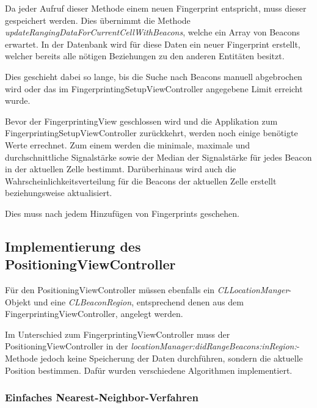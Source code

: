 Da jeder Aufruf dieser Methode einem neuen Fingerprint entspricht, muss dieser gespeichert werden. 
Dies übernimmt die Methode \emph{updateRangingDataForCurrentCellWithBeacons}, welche ein Array von Beacons erwartet. In der Datenbank wird für diese Daten ein neuer Fingerprint erstellt, welcher bereits alle nötigen Beziehungen zu den anderen Entitäten besitzt. 

Dies geschieht dabei so lange, bis die Suche nach Beacons manuell abgebrochen wird oder das im FingerprintingSetupViewController angegebene Limit erreicht wurde. 

Bevor der FingerprintingView geschlossen wird und die Applikation zum FingerprintingSetupViewController zurückkehrt, werden noch einige benötigte Werte errechnet.
Zum einem werden die minimale, maximale und durchschnittliche Signalstärke sowie der Median der Signalstärke für jedes Beacon in der aktuellen Zelle bestimmt. 
Darüberhinaus wird auch die Wahrscheinlichkeitsverteilung für die Beacons der aktuellen Zelle erstellt beziehungsweise aktualisiert.

Dies muss nach jedem Hinzufügen von Fingerprints geschehen.



\subsection{Implementierung des PositioningViewController}
\label{sec:}

Für den PositioningViewController müssen ebenfalls ein \emph{CLLocationManger}-Objekt und eine \emph{CLBeaconRegion}, entsprechend denen aus dem FingerprintingViewController, angelegt werden.

Im Unterschied zum FingerprintingViewController muss der PositioningViewController in der \emph{locationManager:didRangeBeacons:inRegion:}-Methode jedoch keine Speicherung der Daten durchführen, sondern die aktuelle Position bestimmen. Dafür wurden verschiedene Algorithmen implementiert.



\subsubsection{Einfaches Nearest-Neighbor-Verfahren}
\label{sec:}

